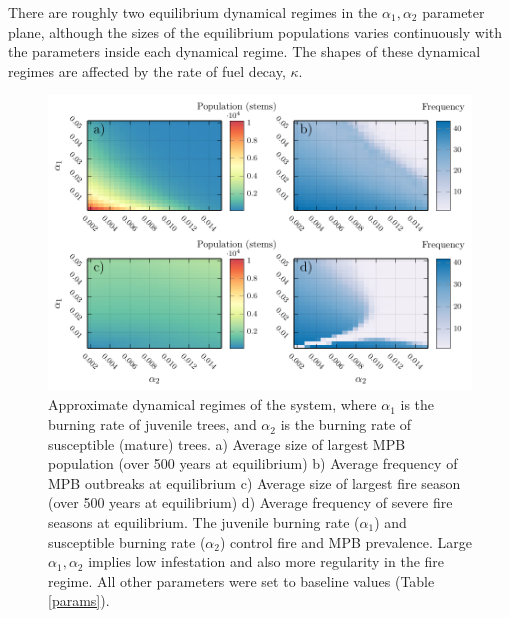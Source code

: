 There are roughly two equilibrium dynamical regimes in the $\alpha_1, \alpha_2$ parameter plane, although the sizes of the equilibrium populations varies continuously with the parameters inside each dynamical regime. The shapes of these dynamical regimes are affected by the rate of fuel decay, $\kappa$. 
\begin{figure}
  \includegraphics[width=\textwidth]{chapter_3/a1_a2_phase.pdf}
\caption{Approximate dynamical regimes of the system, where $\alpha_1$ is the burning rate of juvenile trees, and $\alpha_2$ is the burning rate of susceptible (mature) trees. a) Average size of largest MPB population (over 500 years at equilibrium) b) Average frequency of MPB outbreaks at equilibrium c) Average size of largest fire season (over 500 years at equilibrium) d) Average frequency of severe fire seasons at equilibrium. The juvenile burning rate ($\alpha_1$) and susceptible burning rate ($\alpha_2$) control fire and MPB prevalence. Large $\alpha_1,\alpha_2$ implies low infestation and also more regularity in the fire regime. All other parameters were set to baseline values (Table \ref{params}).}  
\label{dynamical_regimes}
\end{figure}


